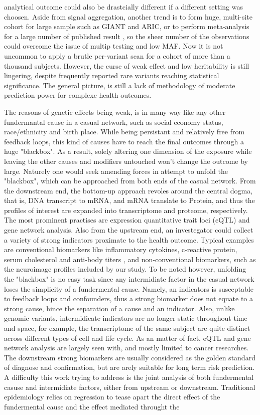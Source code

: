 analytical outcome could also be drastcially different if a different setting was choosen. Aside from signal aggregation, another trend is to form huge, multi-site cohort for large sample such as GIANT and ARIC, or to perform meta-analysis for a large number of published result \cite{META1}, so the sheer number of the observations could overcome the issue of multip testing and low MAF. Now it is not uncommon to apply a brutle per-variant scan for a cohort of more than a thousand subjects. However, the curse of weak effect and low heritability is still lingering, despite frequently reported rare variants reaching statistical significance. The general picture, is still a lack of methodology of moderate prediction power for complexe health outcomes.

The reasons of genetic effects being weak, is in many way like any other fundermantal cause in a casual network, such as social economy status, race/ethnicity and birth place. While being persistant and relatively free from feedback loops, this kind of causes have to reach the final outcomes through a huge "blackbox". As a result, solely altering one dimension of the exposure while leaving the other causes and modifiers untouched won't change the outcome by large. Naturely one would seek amending forces in attempt to unfold the "blackbox", which can be approached from both ends of the casual network. From the downstream end, the bottom-up approach revoles around the central dogma, that is, DNA transcript to mRNA, and mRNA translate to Protein, and thus the profiles of interest are expanded into transcriptome and proteome, respectively. The most prominent practises are expression quantitative trait loci (eQTL)\cite{eQTL1, eQTL2} and gene network analysis. Also from the upstream end, an investegator could collect a variety of strong indicators proximate to the health outcome. Typical examples are conventional biomarkers like inflammatory cytokines, c-reactive protein, serum cholesterol and anti-body titers \cite{cytokine1, CRP1}, and non-conventional biomarkers, such as the neuroimage profiles \cite{VWA1, VWA2, VWA3, VWA4} included by our study. To be noted however, unfolding the "blackbox" is no easy task since any intermidiate factor in the casual network loses the simplicity of a fundermental cause. Namely, an indicators is susceptable to feedback loops and confounders, thus a strong biomarker does not equate to a strong cause, hince the separation of a cause and an indicator. Also, unlike genomic variants, intermidicate indicators are no longer static throughout time and space, for example, the transcriptome of the same subject are quite distinct across different types of cell and life cycle. As an matter of fact, eQTL and gene network analysis are largely seen with, and mostly limited to cancer researches. The downstream strong biomarkers are usually considered as the golden standard of diagnose and confirmation, but are arely suitable for long term risk prediction. A difficulty this work trying to address is the joint analysis of both fundermental casuse and intermidiate factors, either from upstream or downstream. Traditional epidemiology relies on regression to tease apart the direct effect of the fundermental cause and the effect mediated throught the 